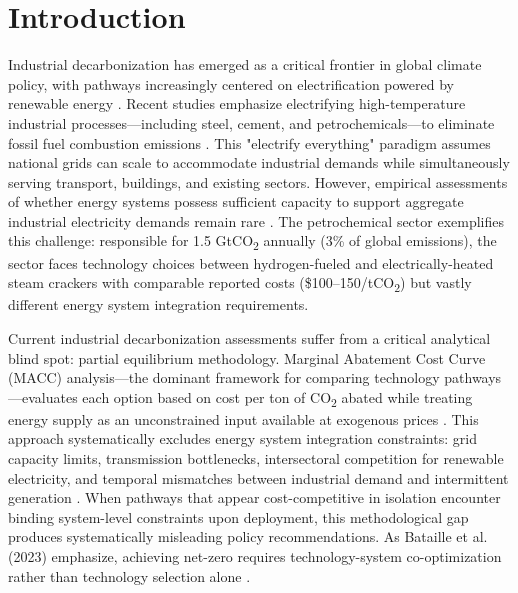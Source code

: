 \documentclass[11pt,a4paper]{article}
\begin{document}
\newpage

\section{Introduction}

Industrial decarbonization has emerged as a critical frontier in global climate policy, with pathways increasingly centered on electrification powered by renewable energy \citep{IEA2023,Kaufman2024}. Recent studies emphasize electrifying high-temperature industrial processes---including steel, cement, and petrochemicals---to eliminate fossil fuel combustion emissions \citep{Kloo2024,Diesing2025}. This "electrify everything" paradigm assumes national grids can scale to accommodate industrial demands while simultaneously serving transport, buildings, and existing sectors. However, empirical assessments of whether energy systems possess sufficient capacity to support aggregate industrial electricity demands remain rare \citep{Fajardy2022,Bataille2023}. The petrochemical sector exemplifies this challenge: responsible for 1.5 GtCO\textsubscript{2} annually (3\% of global emissions), the sector faces technology choices between hydrogen-fueled and electrically-heated steam crackers with comparable reported costs (\$100--150/tCO\textsubscript{2}) but vastly different energy system integration requirements.

Current industrial decarbonization assessments suffer from a critical analytical blind spot: partial equilibrium methodology. Marginal Abatement Cost Curve (MACC) analysis---the dominant framework for comparing technology pathways---evaluates each option based on cost per ton of CO\textsubscript{2} abated while treating energy supply as an unconstrained input available at exogenous prices \citep{Kesicki2021,Cederschiold2020,Chen2019}. This approach systematically excludes energy system integration constraints: grid capacity limits, transmission bottlenecks, intersectoral competition for renewable electricity, and temporal mismatches between industrial demand and intermittent generation \citep{Kaufman2024}. When pathways that appear cost-competitive in isolation encounter binding system-level constraints upon deployment, this methodological gap produces systematically misleading policy recommendations. As Bataille et al. (2023) emphasize, achieving net-zero requires technology-system co-optimization rather than technology selection alone \citep{Bataille2023}.
\end{document}

